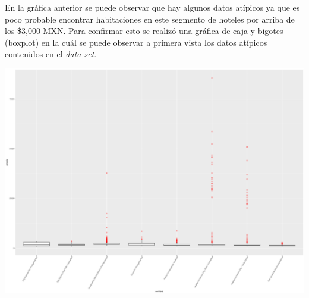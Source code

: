 En la gráfica anterior se puede observar que hay algunos datos atípicos ya que es poco probable encontrar habitaciones en este segmento de hoteles por arriba de los \$3,000 MXN. Para confirmar esto se realizó una gráfica de caja y bigotes (boxplot) en la cuál se puede observar a primera vista los datos atípicos contenidos en el \emph{data set}.

\color{fgcolor}
\includegraphics[width=\maxwidth]{figures/PreciosBoxPlot-1} 






